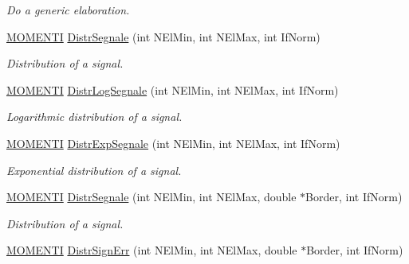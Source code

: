 \begin{DoxyCompactItemize}
\begin{DoxyCompactList}\small\item\em Do a generic elaboration. \end{DoxyCompactList}\item 
\hyperlink{structMOMENTI}{M\+O\+M\+E\+N\+TI} \hyperlink{classVarDatFile_a176c9a10a842e30206fe1ebece6917dc}{Distr\+Segnale} (int N\+El\+Min, int N\+El\+Max, int If\+Norm)\hypertarget{classVarDatFile_a176c9a10a842e30206fe1ebece6917dc}{}\label{classVarDatFile_a176c9a10a842e30206fe1ebece6917dc}

\begin{DoxyCompactList}\small\item\em Distribution of a signal. \end{DoxyCompactList}\item 
\hyperlink{structMOMENTI}{M\+O\+M\+E\+N\+TI} \hyperlink{classVarDatFile_a82c1693acb4e233005f36e72e10d8f84}{Distr\+Log\+Segnale} (int N\+El\+Min, int N\+El\+Max, int If\+Norm)\hypertarget{classVarDatFile_a82c1693acb4e233005f36e72e10d8f84}{}\label{classVarDatFile_a82c1693acb4e233005f36e72e10d8f84}

\begin{DoxyCompactList}\small\item\em Logarithmic distribution of a signal. \end{DoxyCompactList}\item 
\hyperlink{structMOMENTI}{M\+O\+M\+E\+N\+TI} \hyperlink{classVarDatFile_a368bdb3c4de9a07c0ce1ea7edb331778}{Distr\+Exp\+Segnale} (int N\+El\+Min, int N\+El\+Max, int If\+Norm)\hypertarget{classVarDatFile_a368bdb3c4de9a07c0ce1ea7edb331778}{}\label{classVarDatFile_a368bdb3c4de9a07c0ce1ea7edb331778}

\begin{DoxyCompactList}\small\item\em Exponential distribution of a signal. \end{DoxyCompactList}\item 
\hyperlink{structMOMENTI}{M\+O\+M\+E\+N\+TI} \hyperlink{classVarDatFile_a86ca74545b082ee1b6fc140c2d56b943}{Distr\+Segnale} (int N\+El\+Min, int N\+El\+Max, double $\ast$Border, int If\+Norm)\hypertarget{classVarDatFile_a86ca74545b082ee1b6fc140c2d56b943}{}\label{classVarDatFile_a86ca74545b082ee1b6fc140c2d56b943}

\begin{DoxyCompactList}\small\item\em Distribution of a signal. \end{DoxyCompactList}\item 
\hyperlink{structMOMENTI}{M\+O\+M\+E\+N\+TI} \hyperlink{classVarDatFile_a418f05ea3f8e69dbc49adeccddbb8d66}{Distr\+Sign\+Err} (int N\+El\+Min, int N\+El\+Max, double $\ast$Border, int If\+Norm)\hypertarget{classVarDatFile_a418f05ea3f8e69dbc49adeccddbb8d66}{}\label{classVarDatFile_a418f05ea3f8e69dbc49adeccddbb8d66}


\end{DoxyCompactItemize}
